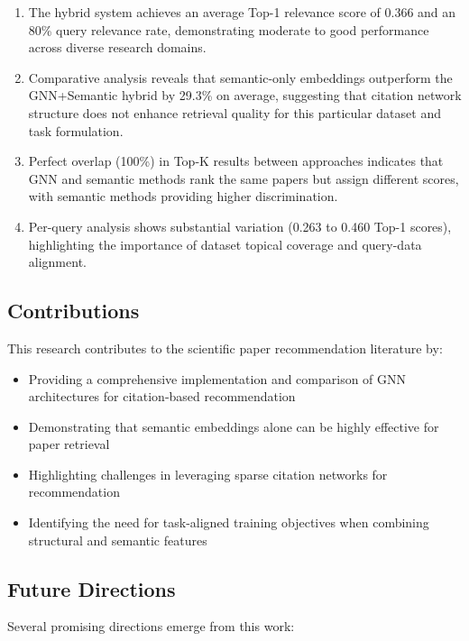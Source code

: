 \documentclass[pdflatex,sn-mathphys-num]{sn-jnl}
\theoremstyle{thmstyleone}%
\theoremstyle{thmstyletwo}%
\theoremstyle{thmstylethree}%
\begin{document}
\begin{enumerate}
    \item The hybrid system achieves an average Top-1 relevance score of 0.366 and an 80\% query relevance rate, demonstrating moderate to good performance across diverse research domains.

    \item Comparative analysis reveals that semantic-only embeddings outperform the GNN+Semantic hybrid by 29.3\% on average, suggesting that citation network structure does not enhance retrieval quality for this particular dataset and task formulation.

    \item Perfect overlap (100\%) in Top-K results between approaches indicates that GNN and semantic methods rank the same papers but assign different scores, with semantic methods providing higher discrimination.

    \item Per-query analysis shows substantial variation (0.263 to 0.460 Top-1 scores), highlighting the importance of dataset topical coverage and query-data alignment.
\end{enumerate}

\subsection{Contributions}

This research contributes to the scientific paper recommendation literature by:

\begin{itemize}
    \item Providing a comprehensive implementation and comparison of GNN architectures for citation-based recommendation
    \item Demonstrating that semantic embeddings alone can be highly effective for paper retrieval
    \item Highlighting challenges in leveraging sparse citation networks for recommendation
    \item Identifying the need for task-aligned training objectives when combining structural and semantic features
\end{itemize}

\subsection{Future Directions}

Several promising directions emerge from this work:
\end{document}
